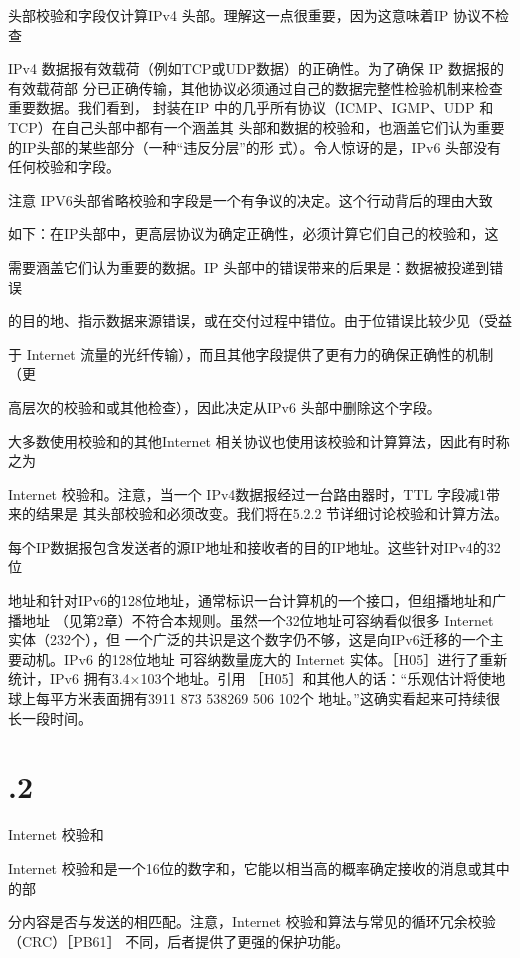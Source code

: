 头部校验和字段仅计算IPv4 头部。理解这一点很重要，因为这意味着IP 协议不检查

IPv4 数据报有效载荷（例如TCP或UDP数据）的正确性。为了确保 IP 数据报的有效载荷部
分已正确传输，其他协议必须通过自己的数据完整性检验机制来检查重要数据。我们看到，
封装在IP 中的几乎所有协议（ICMP、IGMP、UDP 和TCP）在自己头部中都有一个涵盖其
头部和数据的校验和，也涵盖它们认为重要的IP头部的某些部分（一种“违反分层”的形
式）。令人惊讶的是，IPv6 头部没有任何校验和字段。

注意 IPV6头部省略校验和字段是一个有争议的决定。这个行动背后的理由大致

如下：在IP头部中，更高层协议为确定正确性，必须计算它们自己的校验和，这

需要涵盖它们认为重要的数据。IP 头部中的错误带来的后果是：数据被投递到错误

的目的地、指示数据来源错误，或在交付过程中错位。由于位错误比较少见（受益

于 Internet 流量的光纤传输），而且其他字段提供了更有力的确保正确性的机制（更

高层次的校验和或其他检查），因此决定从IPv6 头部中删除这个字段。

大多数使用校验和的其他Internet 相关协议也使用该校验和计算算法，因此有时称之为

Internet 校验和。注意，当一个 IPv4数据报经过一台路由器时，TTL 字段减1带来的结果是
其头部校验和必须改变。我们将在5.2.2 节详细讨论校验和计算方法。

每个IP数据报包含发送者的源IP地址和接收者的目的IP地址。这些针对IPv4的32位

地址和针对IPv6的128位地址，通常标识一台计算机的一个接口，但组播地址和广播地址
（见第2章）不符合本规则。虽然一个32位地址可容纳看似很多 Internet 实体（232个），但
一个广泛的共识是这个数字仍不够，这是向IPv6迁移的一个主要动机。IPv6 的128位地址
可容纳数量庞大的 Internet 实体。［H05］进行了重新统计，IPv6 拥有3.4×103个地址。引用
［H05］和其他人的话：“乐观估计将使地球上每平方米表面拥有3911 873 538269 506 102个
地址。”这确实看起来可持续很长一段时间。

\section{.2}
Internet 校验和

Internet 校验和是一个16位的数字和，它能以相当高的概率确定接收的消息或其中的部

分内容是否与发送的相匹配。注意，Internet 校验和算法与常见的循环冗余校验（CRC）［PB61］
不同，后者提供了更强的保护功能。

